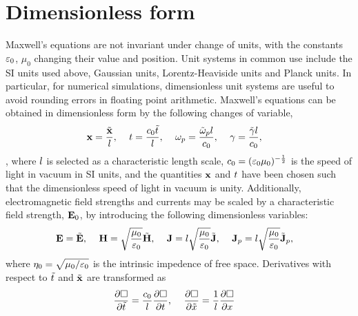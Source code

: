\section{Dimensionless form}
Maxwell's equations are not invariant under change of units, with the constants
$\varepsilon_0$, $\mu_0$ changing their value and position. Unit systems in common use
include the SI units used above, Gaussian units, Lorentz-Heaviside units and
Planck units. In particular, for numerical simulations, dimensionless unit
systems are useful to avoid rounding errors in floating point arithmetic. Maxwell's equations can be obtained in dimensionless form by the following changes of variable,
\begin{align}
  \label{eq:dimensionless-scaling-1}
  \mathbf{x} &= \frac{\tilde{\mathbf{x}}}{l}, &  \
                                        t &= \frac{c_0 \tilde{t}}{l}, &  \
                                                                                \omega_p &= \frac{\tilde{\omega}_p l}{c_0}, & \
                                                                                                                                       \gamma &= \frac{\tilde{\gamma} l}{c_0},
\end{align},
where $l$ is selected as a characteristic length scale, $c_0 = ( \varepsilon_0 \mu_0 )^{-\frac{1}{2}}$ is the speed of light in vacuum
in SI units, and the quantities $\mathbf{x}$ and $t$ have been chosen such that the
dimensionless speed of light in vacuum is unity.
Additionally, electromagnetic field strengths and currents may be scaled by a characteristic field strength,
$\mathbf{E}_0$, by introducing the following dimensionless variables:
\begin{align}
  \label{eq:dimensionless-scaling-2}
  \mathbf{E} &= \tilde{\mathbf{E}}, &  \
                   \mathbf{H} &= \sqrt{\frac{\mu_0}{\varepsilon_0}} \tilde{\mathbf{H}}, &  \
                                              \mathbf{J} &= l \sqrt{\frac{\mu_0}{\varepsilon_0}} \tilde{\mathbf{J}}, & \
                                                                                  \mathbf{J}_p &= l \sqrt{\frac{\mu_0}{\varepsilon_0}} \tilde{\mathbf{J}}_p,
\end{align}
where $\eta_0 = \sqrt{\mu_0 / \varepsilon_0}$ is the intrinsic impedence of free space. Derivatives with respect to $\tilde{t}$ and $\tilde{\mathbf{x}}$ are transformed as
\begin{align} \label{eq:dimensionless-scaling-3} \frac{\partial \Box}{\partial \tilde{t} } &= \frac{c_0}{l}\frac{\partial \Box}{\partial t}, & \ \frac{\partial \Box}{\partial \tilde{x}} &= \frac{1}{l}\frac{\partial \Box}{\partial x} \end{align}
